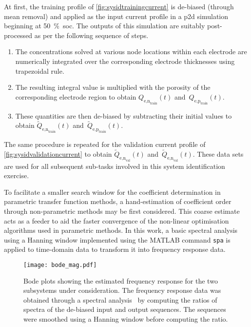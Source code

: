 At first, the training profile of \cref{fig:sysidtrainingcurrent} is de-biased
(through mean removal) and applied as the input current profile in a \gls{p2d}
simulation beginning at \SI{50}{\percent}~\gls{soc}. The outputs of this
simulation are suitably post-processed as per the following sequence of steps.
\begin{enumerate}
    \item The concentrations solved at various node locations within each
        electrode are numerically integrated over the corresponding electrode
        thicknesses using trapezoidal rule.
    \item The resulting integral value is multiplied with the porosity of the
        corresponding electrode region to obtain
        $Q_{\text{e,n}_\text{train}}(t)$ and~$Q_{\text{e,p}_\text{train}}(t)$.
    \item These quantities are then de-biased by subtracting their initial
        values to obtain $\widetilde{Q}_{\text{e,n}_\text{train}}(t)$
        and~$\widetilde{Q}_{\text{e,p}_\text{train}}(t)$.
\end{enumerate}

The        same        procedure        is        repeated        for        the
validation       current      profile       of \cref{fig:sysidvalidationcurrent}
to         obtain         $\widetilde{Q}_{\text{e,n}_\text{val}}(t)$         and~$\widetilde{Q}_{\text{e,n}_\text{val}}(t)$.  These data  sets are  used for  all
subsequent sub-tasks involved in this system identification exercise.

To facilitate a smaller search  window for  the  coefficient determination  in
parametric transfer  function methods,  a hand-estimation  of coefficient
order  through non-parametric  methods may  be  first considered.  This coarse
estimate acts as  a  feeder to  aid  the faster  convergence  of the
non-linear optimisation algorithms  used in parametric  methods. In this
work,  a basic spectral analysis  using a Hanning  window implemented using the
MATLAB command \texttt{spa} is applied to time-domain data to transform it
into frequency response data.

\begin{figure}[!htb]
    \centering
    \texttt{[image: bode\_mag.pdf]}
    \caption[Bode plots of the electrolyte time-evolution sub-systems]{%
        Bode plots showing the  estimated frequency response  for the
        two  subsystems under  consideration.  The frequency  response data  was
        obtained  through a spectral  analysis \ie~by computing  the ratios  of
        spectra of the de-biased input  and output sequences. The sequences were
        smoothed using a Hanning window before computing the ratio.
    }%
    \label{fig:initialbodemag}
\end{figure}

